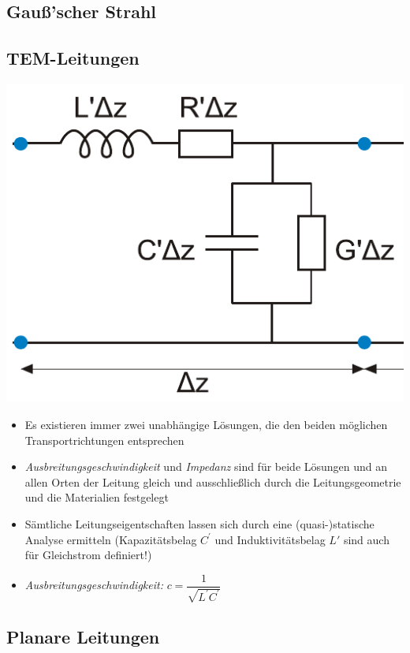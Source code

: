 {\begin{itemize}
 \end{itemize}
 \subsection{Gauß'scher Strahl}
 \subsection{TEM-Leitungen}
 \includegraphics[width=.25\paperheight]{content/fuw/pictures/fuw_tem_ersatzschaltbild.png}
  \begin{itemize}
     \itemsep0pt
     \item Es existieren immer zwei unabhängige Lösungen, die den beiden möglichen Transportrichtungen entsprechen
     \item \textit{Ausbreitungsgeschwindigkeit} und \textit{Impedanz} sind für beide Lösungen und an allen Orten der Leitung gleich und ausschließlich durch die Leitungsgeometrie und die Materialien festgelegt
     \item Sämtliche Leitungseigentschaften lassen sich durch eine (quasi-)statische Analyse ermitteln (Kapazitätsbelag $C^\prime$ und Induktivitätsbelag $L\prime$ sind auch für Gleichstrom definiert!)
     \item \textit{Ausbreitungsgeschwindigkeit:} \(c = \dfrac{1}{\sqrt{L^\prime C^\prime}}\)
 \end{itemize}
 \subsection{Planare Leitungen}
 }
